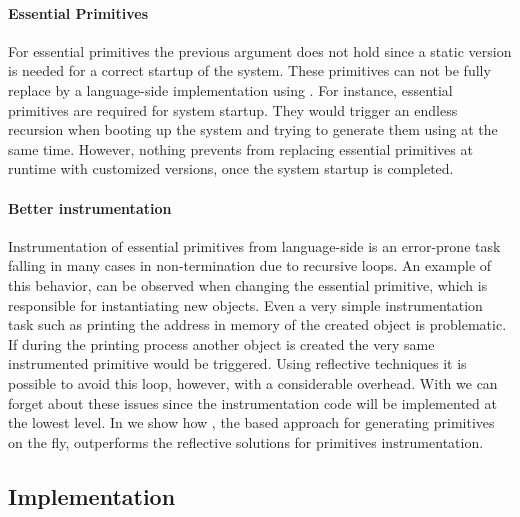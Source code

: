 \paragraph{Essential Primitives}
For essential primitives the previous argument does not hold since a static version is needed for a correct startup of the system.
These primitives can not be fully replace by a language-side implementation using \WF.
For instance, essential primitives are required for system startup.
They would trigger an endless recursion when booting up the system and trying to generate them using \WF at the same time.
However, nothing prevents from replacing essential primitives at runtime with customized versions, once the system startup is completed. 

\paragraph{Better instrumentation}
Instrumentation of essential primitives from lan\-guage-side is an error-prone task falling in many cases in non-termination due to recursive loops. 
An example of this behavior, can be observed when changing the essential  primitive, which is responsible for instantiating new objects.
Even a very simple instrumentation task such as printing the address in memory of the created object is problematic.
If during the printing process another object is created the very same instrumented  primitive would be triggered.
Using reflective techniques it is possible to avoid this loop, however, with a considerable overhead.
With \WF we can forget about these issues since the instrumentation code will be implemented at the lowest level.
In  we show how \WF, the \B based approach for generating primitives on the fly, outperforms the reflective solutions for primitives instrumentation. 


\subsection{Implementation}
 \\
 \\

